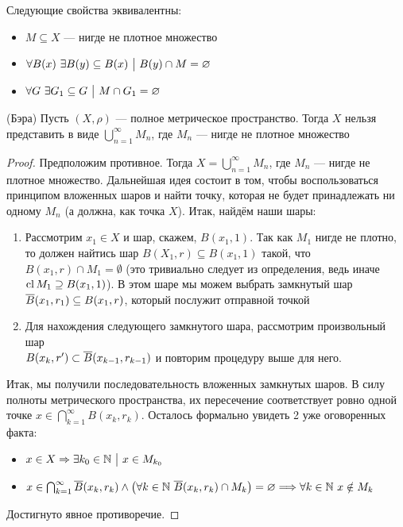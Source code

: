 \begin{proposition}
	Следующие свойства эквивалентны:
	\begin{itemize}
		\item $M \subseteq X$ --- нигде не плотное множество
		
		\item $\forall B(x)\ \exists B(y) \subseteq B(x) \ \big|\  B(y) \cap M = \varnothing$
		
		\item $\forall G\ \exists G_1 \subseteq G \ \big|\  M \cap G_1 = \varnothing$
	\end{itemize}
\end{proposition}

\begin{theorem} (Бэра)
	Пусть $(X, \rho)$ --- полное метрическое пространство. Тогда $X$ нельзя представить в виде $\bigcup_{n = 1}^\infty M_n$, где $M_n$ --- нигде не плотное множество
\end{theorem}

\begin{proof}
	Предположим противное. Тогда $X = \bigcup_{n = 1}^\infty M_n$, где $M_n$ --- нигде не плотное множество. Дальнейшая идея состоит в том, чтобы воспользоваться принципом вложенных шаров и найти точку, которая не будет принадлежать ни одному $M_n$ (а должна, как точка $X$). Итак, найдём наши шары:
	\begin{enumerate}
		\item Рассмотрим $x_1 \in X$ и шар, скажем, $B(x_1, 1)$. Так как $M_1$ нигде не плотно, то должен найтись шар $B(X_1, r) \subseteq B(x_1, 1)$ такой, что $B(x_1, r) \cap M_1 = \emptyset$ (это тривиально следует из определения, ведь иначе $\operatorname{cl} M_1 \supseteq B(x_1, 1)$). В этом шаре мы можем выбрать замкнутый шар $\overline{B}(x_1, r_1) \subseteq B(x_1, r)$, который послужит отправной точкой
		
		\item Для нахождения следующего замкнутого шара, рассмотрим произвольный шар \\ $B(x_k, r') \subset \overline{B}(x_{k - 1}, r_{k - 1})$ и повторим процедуру выше для него.
	\end{enumerate}
	Итак, мы получили последовательность вложенных замкнутых шаров. В силу полноты метрического пространства, их пересечение соответствует ровно одной точке $x \in \bigcap_{k = 1}^\infty B(x_k, r_k)$. Осталось формально увидеть 2 уже оговоренных факта:
	\begin{itemize}
		\item $x \in X \Rightarrow \exists k_0 \in \mathbb{N} \ \big|\  x \in M_{k_0}$
		
		\item $x \in \bigcap_{k = 1}^\infty \overline{B}(x_k, r_k) \wedge \big(\forall k \in \mathbb{N}\ \overline{B}(x_k, r_k) \cap M_k\big) = \varnothing \Longrightarrow \forall k \in \mathbb{N}\ x \notin M_k$
	\end{itemize}
	Достигнуто явное противоречие.
\end{proof}

